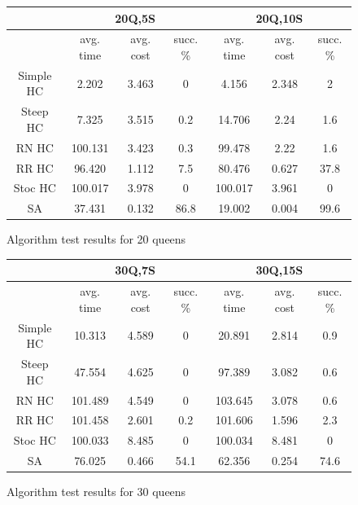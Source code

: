 \documentclass[10pt,a4paper]{article}
\begin{document}
                \begin{figure}[h!]
                        \centering
                        \caption{Algorithm test results for 20 queens}
                        \begin{tabular}{|c|c|c|c|c|c|c|}
                                \hline \hline
                                & \multicolumn{3}{c|}{20Q,5S} & \multicolumn{3}{c|}{20Q,10S} \\
                                \hline
                                &avg. time&avg. cost&succ. \%&avg. time&avg. cost&succ. \% \\
                                \hline \hline
				Simple HC&2.202&3.463&0&4.156&2.348&2 \\
                                \hline
				Steep HC&7.325&3.515&0.2&14.706&2.24&1.6 \\
                                \hline
				RN HC&100.131&3.423&0.3&99.478&2.22&1.6 \\
                                \hline
				RR HC&96.420&1.112&7.5&80.476&0.627&37.8 \\
                                \hline
				Stoc HC&100.017&3.978&0&100.017&3.961&0 \\
                                \hline
				SA&37.431&0.132&86.8&19.002&0.004&99.6 \\
                                \hline
                        \end{tabular}
                \end{figure}
                \begin{figure}[h!]
                        \centering
                        \caption{Algorithm test results for 30 queens}
                        \begin{tabular}{|c|c|c|c|c|c|c|}
                                \hline \hline
                                & \multicolumn{3}{c|}{30Q,7S} & \multicolumn{3}{c|}{30Q,15S} \\
                                \hline
                                &avg. time&avg. cost&succ. \%&avg. time&avg. cost&succ. \% \\
                                \hline \hline
				Simple HC&10.313&4.589&0&20.891&2.814&0.9 \\
                                \hline
				Steep HC&47.554&4.625&0&97.389&3.082&0.6 \\
                                \hline
				RN HC&101.489&4.549&0&103.645&3.078&0.6 \\
                                \hline
				RR HC&101.458&2.601&0.2&101.606&1.596&2.3 \\
                                \hline
				Stoc HC&100.033&8.485&0&100.034&8.481&0 \\
                                \hline
				SA&76.025&0.466&54.1&62.356&0.254&74.6 \\
                                \hline
                        \end{tabular}
                \end{figure}
\end{document}
